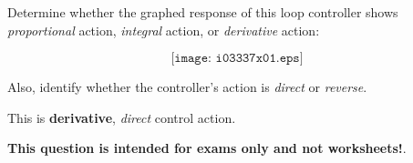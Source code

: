 

Determine whether the graphed response of this loop controller shows {\it proportional} action, {\it integral} action, or {\it derivative} action:

$$\texttt{[image: i03337x01.eps]}$$

Also, identify whether the controller's action is {\it direct} or {\it reverse}.







This is {\bf derivative}, {\it direct} control action.







{\bf This question is intended for exams only and not worksheets!}.



